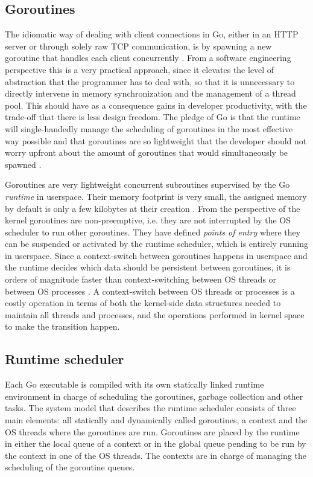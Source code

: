 \subsection{Goroutines}
The idiomatic way of dealing with client connections in Go, either in an HTTP server or through solely raw TCP communication, is by spawning a new goroutine that handles each client concurrently \cite{Morsing2013_2}\cite{GoNet}\cite{GoHTTP}. From a software engineering perspective this is a very practical approach, since it elevates the level of abstraction that the programmer has to deal with, so that it is unnecessary to directly intervene in memory synchronization and the management of a thread pool. This should have as a consequence gains in developer productivity, with the trade-off that there is less design freedom. The pledge of Go is that the runtime will single-handedly manage the scheduling of goroutines in the most effective way possible and that goroutines are so lightweight that the developer should not worry upfront about the amount of goroutines that would simultaneously be spawned \cite{Cox-Buday2017}.

Goroutines are very lightweight concurrent subroutines  supervised by the Go \textit{runtime} in userspace. Their memory footprint is very small, the assigned memory by default is only a few kilobytes at their creation \cite{Cox-Buday2017}. From the perspective of the kernel goroutines are non-preemptive, i.e. they are not interrupted by the OS scheduler to run other goroutines. They have defined \textit{points of entry} where they can be suspended or activated by the runtime scheduler, which is entirely running in userspace. Since a context-switch between goroutines happens in userspace and the runtime decides which data should be persistent between goroutines, it is orders of magnitude faster than context-switching between OS threads \cite{Cox-Buday2017} or between OS processes \cite{Kerrisk2010}. A context-switch between OS threads or processes is a costly operation in terms of both the kernel-side data structures needed to maintain all threads and processes, and the operations performed in kernel space to make the transition happen.

\subsection{Runtime scheduler}
Each Go executable is compiled with its own statically linked runtime environment in charge of scheduling the goroutines, garbage collection and other tasks. The system model that describes the runtime scheduler consists of three main elements: all statically and dynamically called goroutines, a context and the OS threads where the goroutines are run. Goroutines are placed by the runtime in either the local queue of a context or in the global queue pending to be run by the context in one of the OS threads. The contexts are in charge of managing the scheduling of the goroutine queues.

